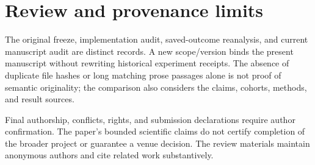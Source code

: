 \documentclass[10pt,letterpaper]{article}
\begin{document}
\section{Review and provenance limits}
The original freeze, implementation audit, saved-outcome reanalysis, and current manuscript audit are distinct records. A new scope/version binds the present manuscript without rewriting historical experiment receipts. The absence of duplicate file hashes or long matching prose passages alone is not proof of semantic originality; the comparison also considers the claims, cohorts, methods, and result sources.

Final authorship, conflicts, rights, and submission declarations require author confirmation. The paper's bounded scientific claims do not certify completion of the broader project or guarantee a venue decision. The review materials maintain anonymous authors and cite related work substantively.


\end{document}
